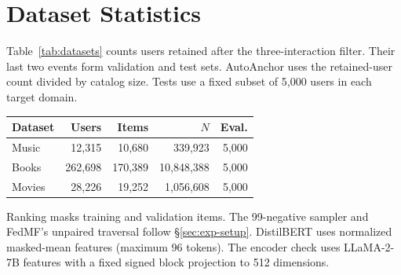 \section{Dataset Statistics}
\label{app:data}
Table~\ref{tab:datasets} counts users retained after the three-interaction filter. Their last two events form validation and test sets. AutoAnchor uses the retained-user count divided by catalog size. Tests use a fixed subset of 5,000 users in each target domain.

\par\addvspace{6pt}\noindent\begin{minipage}{\columnwidth}\centering\small
{}
\label{tab:datasets}
\setlength{\tabcolsep}{2.5pt}
\begin{tabular}{@{}lrrrr@{}}
\toprule
Dataset & Users & Items & $N$ & Eval. \\
\midrule
Music & 12,315 & 10,680 & 339,923 & 5,000 \\
Books & 262,698 & 170,389 & 10,848,388 & 5,000 \\
Movies & 28,226 & 19,252 & 1,056,608 & 5,000 \\
\bottomrule
\end{tabular}
\end{minipage}\par\addvspace{6pt}

Ranking masks training and validation items. The 99-negative sampler and FedMF's unpaired traversal follow \S\ref{sec:exp-setup}. DistilBERT uses normalized masked-mean features (maximum 96 tokens). The encoder check uses LLaMA-2-7B features with a fixed signed block projection to 512 dimensions.
